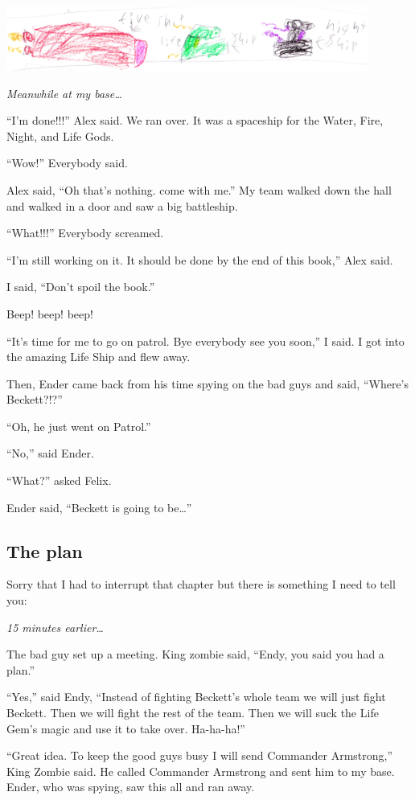 \documentclass[12pt,twoside]{krantz}
\begin{document}
\includegraphics[width=4.6875in,height=\textheight]{img/four-bad-guys/threeships.jpg}

\emph{Meanwhile at my base\ldots{}}

``I'm done!!!'' Alex said. We ran over. It was a spaceship for the
Water, Fire, Night, and Life Gods.

``Wow!'' Everybody said.

Alex said, ``Oh that's nothing. come with me.'' My team walked down the
hall and walked in a door and saw a big battleship.

``What!!!'' Everybody screamed.

``I'm still working on it. It should be done by the end of this book,''
Alex said.

I said, ``Don't spoil the book.''

Beep! beep! beep!

``It's time for me to go on patrol. Bye everybody see you soon,'' I
said. I got into the amazing Life Ship and flew away.

Then, Ender came back from his time spying on the bad guys and said,
``Where's Beckett?!?''

``Oh, he just went on Patrol.''

``No,'' said Ender.

``What?'' asked Felix.

Ender said, ``Beckett is going to be\ldots{}''

\hypertarget{the-plan}{%
\subsection{The plan}\label{the-plan}}

Sorry that I had to interrupt that chapter but there is something I need
to tell you:

\emph{15 minutes earlier\ldots{}}

The bad guy set up a meeting. King zombie said, ``Endy, you said you had
a plan.''

``Yes,'' said Endy, ``Instead of fighting Beckett's whole team we will
just fight Beckett. Then we will fight the rest of the team. Then we
will suck the Life Gem's magic and use it to take over. Ha-ha-ha!''

``Great idea. To keep the good guys busy I will send Commander
Armstrong,'' King Zombie said. He called Commander Armstrong and sent
him to my base. Ender, who was spying, saw this all and ran away.
\end{document}
